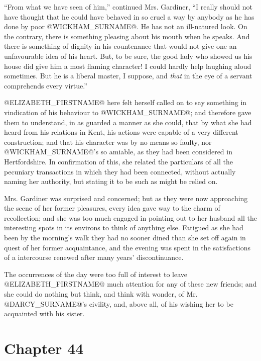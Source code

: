 ``From what we have seen of him,'' continued Mrs. Gardiner, ``I really
should not have thought that he could have behaved in so cruel a way by
anybody as he has done by poor @WICKHAM_SURNAME@. He has not an ill-natured look.
On the contrary, there is something pleasing about his mouth when he
speaks. And there is something of dignity in his countenance that would
not give one an unfavourable idea of his heart. But, to be sure, the
good lady who showed us his house did give him a most flaming character!
I could hardly help laughing aloud sometimes. But he is a liberal
master, I suppose, and \textit{that} in the eye of a servant comprehends every
virtue.''

@ELIZABETH_FIRSTNAME@ here felt herself called on to say something in vindication of
his behaviour to @WICKHAM_SURNAME@; and therefore gave them to understand, in
as guarded a manner as she could, that by what she had heard from
his relations in Kent, his actions were capable of a very different
construction; and that his character was by no means so faulty, nor
@WICKHAM_SURNAME@'s so amiable, as they had been considered in Hertfordshire. In
confirmation of this, she related the particulars of all the pecuniary
transactions in which they had been connected, without actually naming
her authority, but stating it to be such as might be relied on.

Mrs. Gardiner was surprised and concerned; but as they were now
approaching the scene of her former pleasures, every idea gave way to
the charm of recollection; and she was too much engaged in pointing out
to her husband all the interesting spots in its environs to think of
anything else. Fatigued as she had been by the morning's walk they
had no sooner dined than she set off again in quest of her former
acquaintance, and the evening was spent in the satisfactions of a
intercourse renewed after many years' discontinuance.

The occurrences of the day were too full of interest to leave @ELIZABETH_FIRSTNAME@
much attention for any of these new friends; and she could do nothing
but think, and think with wonder, of Mr. @DARCY_SURNAME@'s civility, and, above
all, of his wishing her to be acquainted with his sister.



\chapter*{Chapter 44}


